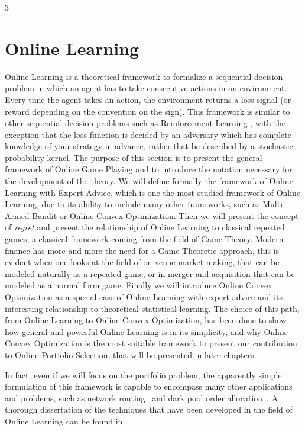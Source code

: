 3\chapter{Online Learning}\label{ch:OnlineLearning}
Online Learning is a theoretical framework to formalize a sequential decision problem in which an agent has to take consecutive actions in an environment. Every time the agent takes an action, the environment returns a loss signal (or reward depending on the convention on the sign). This framework is similar to other sequential decision problems such as Reinforcement Learning \cite{sutton1998introduction}, with the exception that the loss function is decided by an adversary which has complete knowledge of your strategy in advance, rather that be described by a stochastic probability kernel. 
The purpose of this section is to present the general framework of Online Game Playing and to introduce the notation necessary for the development of the theory. We will define formally the framework of Online Learning with Expert Advice, which is one the most studied framework of Online Learning, due to its ability to include many other frameworks, such as Multi Armed Bandit or Online Convex Optimization. 
Then we will present the concept of \emph{regret} and present the relationship of Online Learning to classical repeated games, a classical framework coming from the field of Game Theory. Modern finance  has more and more the need for a Game Theoretic approach, this is evident when one looks at the field of on venue market making, that can be modeled naturally as a repeated game, or in merger and acquisition that can be modeled as a normal form game. 
Finally we will introduce Online Convex Optimization as a special case of Online Learning with expert advice and its interesting relationship to theoretical statistical learning. The choice of this path, from Online Learning to Online Convex Optimization, has been done to show how general and powerful Online Learning is in its simplicity, and why Online Convex Optimization is the most suitable framework to present our contribution to Online Portfolio Selection, that will be presented in later chapters.

In fact, even if we will focus on the portfolio problem, the apparently simple formulation of this framework is capable to encompass many other applications and problems, such as network routing~\cite{belmega2018online} and dark pool order allocation~\cite{agarwal2010optimal}. 
A thorough dissertation of the techniques that have been developed in the field of Online Learning can be found in \cite{cesa2006prediction}.

